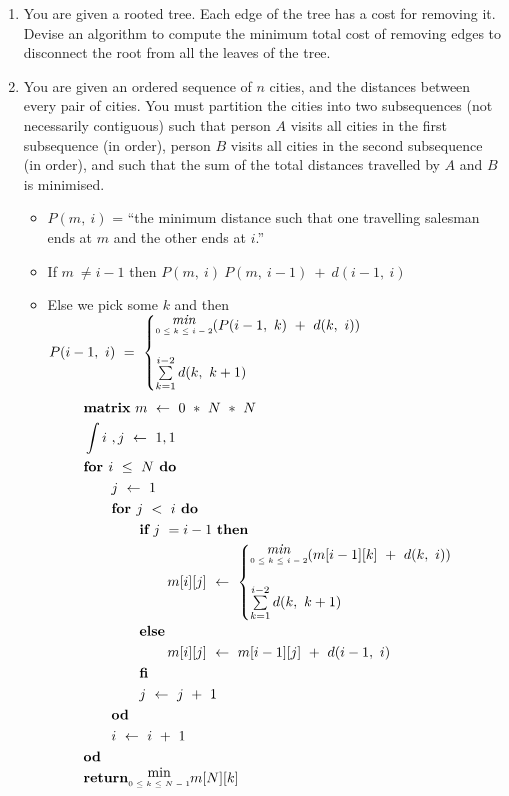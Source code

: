 \documentclass[a4paper]{article}
\begin{document}
\begin{enumerate}
				\item You are given a rooted tree. Each edge of the tree has a cost for removing it. Devise an algorithm to compute the minimum total cost of removing edges to disconnect the root from all the leaves of the tree.

				\item You are given an ordered sequence of $n$ cities, and the distances between every pair of cities. You must partition the cities into two subsequences (not necessarily contiguous) such that person $A$ visits all cities in the first subsequence (in order), person $B$ visits all cities in the second subsequence (in order), and such that the sum of the total distances travelled by $A$ and $B$ is minimised.
\begin{itemize}
\item $P(m,\ i)$ = ``the minimum distance such that one travelling salesman ends at $m$ and the other ends at $i$.''
\item If $m\ \neq i-1$ then $P(m,\ i) \ P(m,\ i-1)\ +\ d(i-1,\ i)$
\item Else we pick some $k$ and then $P(i-1,\ i)\ =\ 
\begin{cases}
\text{\stackanchor{\textit{min}}{\tiny$0\leq k\leq i-2$}}(P(i-1,\ k)\ +\ d(k,\ i)) \\
\\
\sum\limits_{k=1}^{i-2} d(k,\ k+1)
\end{cases} $
\begin{align*}
&\textbf{matrix}\ m\ \gets\ {{0}\ *\ N}\ *\ N \\
&\int i\ ,j\ \gets\ 1, 1\\
&\textbf{for } i\ \leq\ N \textbf{ do}\\
&\qquad j\ \gets\ 1\\
&\qquad \textbf{for }j\ <\ i \textbf{ do} \\
&\qquad\qquad\textbf{if}\ j\ = i-1\ \textbf{then} \\
&\qquad\qquad\qquad m[i][j]\ \gets\ 
\begin{cases}
\text{\stackanchor{\textit{min}}{\tiny$0\leq k\leq i-2$}}(m[i-1][k]\ +\ d(k,\ i)) \\
\\
\sum\limits_{k=1}^{i-2} d(k,\ k+1)
\end{cases} \\ 
&\qquad\qquad\textbf{else}\\
&\qquad\qquad\qquad m[i][j]\ \gets\ m[i-1][j]\ +\ d(i-1,\ i) \\
&\qquad\qquad\textbf{fi}\\
&\qquad\qquad j\ \gets\ j\ +\ 1 \\
&\qquad\textbf{od} \\
&\qquad i\ \gets\ i\ +\ 1 \\
&\textbf{od} \\
&\textbf{return} \text{\stackanchor{min}{\tiny$0\leq k\leq N-1$}} m[N][k]
\end{align*}




\end{itemize}
\end{enumerate}
\end{document}
